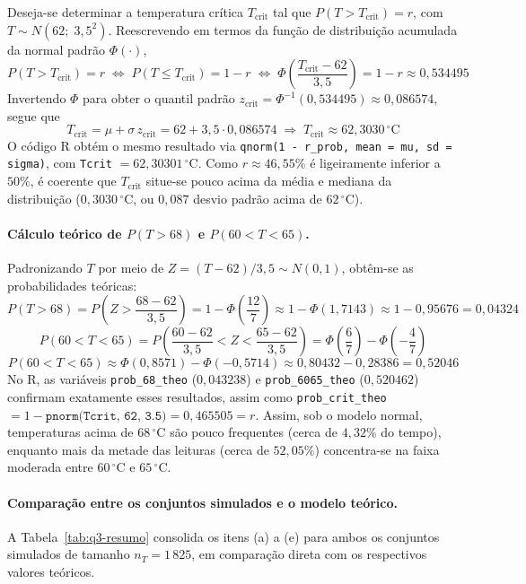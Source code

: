 \documentclass[10pt,a4paper]{article}
\begin{document}
Deseja-se determinar a temperatura crítica $T_{\text{crit}}$ tal que $P(T > T_{\text{crit}}) = r$, com $T \sim N(62;\; 3{,}5^{2})$. Reescrevendo em termos da função de distribuição acumulada da normal padrão $\Phi(\cdot)$,
\[
P(T > T_{\text{crit}}) = r \;\Longleftrightarrow\; P(T \le T_{\text{crit}}) = 1 - r \;\Longleftrightarrow\; \Phi\!\left(\frac{T_{\text{crit}} - 62}{3{,}5}\right) = 1 - r \approx 0{,}534495
\]
Invertendo $\Phi$ para obter o quantil padrão $z_{\text{crit}} = \Phi^{-1}(0{,}534495) \approx 0{,}086574$, segue que
\[
T_{\text{crit}} = \mu + \sigma\,z_{\text{crit}} = 62 + 3{,}5 \cdot 0{,}086574 \;\Longrightarrow\; \boxed{T_{\text{crit}} \approx 62{,}3030\,^\circ\text{C}}
\]
O código R obtém o mesmo resultado via \texttt{qnorm(1 - r\_prob, mean = mu, sd = sigma)}, com \texttt{Tcrit} $= 62{,}30301\,^\circ\text{C}$. Como $r \approx 46{,}55\%$ é ligeiramente inferior a $50\%$, é coerente que $T_{\text{crit}}$ situe-se pouco acima da média e mediana da distribuição ($0{,}3030\,^\circ\text{C}$, ou $0{,}087$ desvio padrão acima de $62\,^\circ\text{C}$).

\paragraph{Cálculo teórico de $P(T > 68)$ e $P(60 < T < 65)$.} Padronizando $T$ por meio de $Z = (T - 62)/3{,}5 \sim N(0, 1)$, obtêm-se as probabilidades teóricas:
\[
P(T > 68) = P\!\left(Z > \frac{68 - 62}{3{,}5}\right) = 1 - \Phi\!\left(\frac{12}{7}\right) \approx 1 - \Phi(1{,}7143) \approx 1 - 0{,}95676 = \boxed{0{,}04324}
\]
\[
P(60 < T < 65) = P\!\left(\frac{60 - 62}{3{,}5} < Z < \frac{65 - 62}{3{,}5}\right) = \Phi\!\left(\frac{6}{7}\right) - \Phi\!\left(-\frac{4}{7}\right)
\]
\[
P(60 < T < 65) \approx \Phi(0{,}8571) - \Phi(-0{,}5714) \approx 0{,}80432 - 0{,}28386 = \boxed{0{,}52046}
\]
No R, as variáveis \texttt{prob\_68\_theo} ($0{,}043238$) e \texttt{prob\_6065\_theo} ($0{,}520462$) confirmam exatamente esses resultados, assim como \texttt{prob\_crit\_theo} $= 1 - \texttt{pnorm(Tcrit, 62, 3.5)} = 0{,}465505 = r$. Assim, sob o modelo normal, temperaturas acima de $68\,^\circ\text{C}$ são pouco frequentes (cerca de $4{,}32\%$ do tempo), enquanto mais da metade das leituras (cerca de $52{,}05\%$) concentra-se na faixa moderada entre $60\,^\circ\text{C}$ e $65\,^\circ\text{C}$.

\paragraph{Comparação entre os conjuntos simulados e o modelo teórico.} A Tabela~\ref{tab:q3-resumo} consolida os itens (a) a (e) para ambos os conjuntos simulados de tamanho $n_T = 1\,825$, em comparação direta com os respectivos valores teóricos.
\end{document}
